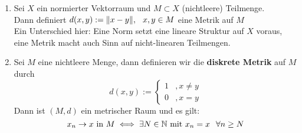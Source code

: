 \begin{beispiel}
	\begin{enumerate}[label=\alph*\upshape)]
		\item Sei $X$ ein normierter Vektorraum und $M \subset X$ (nichtleere) Teilmenge. \\
		Dann definiert $d(x, y) := \| x - y\|, \hspace{0.25cm} x, y \in M$ eine Metrik auf $M$ \\
		Ein Unterschied hier: Eine Norm setzt eine lineare Struktur auf $X$ voraus, eine Metrik macht auch Sinn auf nicht-linearen Teilmengen.
		\item {} \label{bsp:1-diskreteMetrik} Sei $M$ eine nichtleere Menge, dann definieren wir die \textbf{diskrete Metrik} auf $M$ durch
			\[ d(x, y) := \begin{cases}1 &, x \neq y \\ 0 &, x = y\end{cases} \]
			Dann ist $(M, d)$ ein metrischer Raum und es gilt: 
				\[ x_{n} \rightarrow x \text{ in } M \iff \exists N \in \mathbb{N} \text{ mit } x_{n} = x \hspace{0.25cm} \forall n \geq N \]
	\end{enumerate}	
\end{beispiel}

